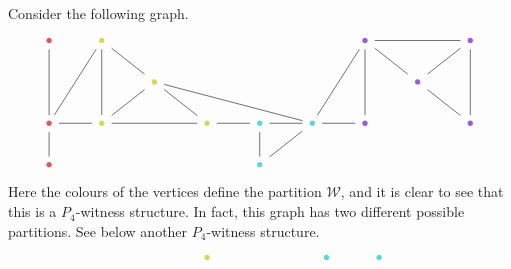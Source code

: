 \begin{example}
  Consider the following graph.
  \[\begin{tikzcd}
      \textcolor{rgb,255:red,214;green,92;blue,92}{\bullet} & \textcolor{rgb,255:red,214;green,214;blue,92}{\bullet} &&&&& \textcolor{rgb,255:red,153;green,92;blue,214}{\bullet} && \textcolor{rgb,255:red,153;green,92;blue,214}{\bullet} \\
      && \textcolor{rgb,255:red,214;green,214;blue,92}{\bullet} &&&&& \textcolor{rgb,255:red,153;green,92;blue,214}{\bullet} \\
      \textcolor{rgb,255:red,214;green,92;blue,92}{\bullet} & \textcolor{rgb,255:red,214;green,214;blue,92}{\bullet} && \textcolor{rgb,255:red,214;green,214;blue,92}{\bullet} & \textcolor{rgb,255:red,92;green,214;blue,214}{\bullet} & \textcolor{rgb,255:red,92;green,214;blue,214}{\bullet} & \textcolor{rgb,255:red,153;green,92;blue,214}{\bullet} && \textcolor{rgb,255:red,153;green,92;blue,214}{\bullet} \\
      \textcolor{rgb,255:red,214;green,92;blue,92}{\bullet} &&&& \textcolor{rgb,255:red,92;green,214;blue,214}{\bullet}
      \arrow[no head, from=1-1, to=3-1]
      \arrow[no head, from=3-1, to=4-1]
      \arrow[no head, from=1-2, to=3-2]
      \arrow[no head, from=3-2, to=2-3]
      \arrow[no head, from=2-3, to=3-4]
      \arrow[no head, from=3-4, to=3-2]
      \arrow[no head, from=3-2, to=3-1]
      \arrow[no head, from=3-1, to=1-2]
      \arrow[no head, from=3-4, to=3-5]
      \arrow[no head, from=3-5, to=4-5]
      \arrow[no head, from=4-5, to=3-6]
      \arrow[no head, from=3-6, to=1-7]
      \arrow[no head, from=1-7, to=1-9]
      \arrow[no head, from=1-9, to=2-8]
      \arrow[no head, from=2-8, to=3-9]
      \arrow[no head, from=3-9, to=1-9]
      \arrow[no head, from=2-8, to=1-7]
      \arrow[no head, from=3-7, to=1-7]
      \arrow[no head, from=3-5, to=3-6]
      \arrow[no head, from=3-6, to=2-3]
      \arrow[no head, from=2-3, to=1-2]
      \arrow[no head, from=3-6, to=3-7]
    \end{tikzcd}\]
  Here the colours of the vertices define the partition $\mathcal W$, and it is clear to see that this is a $P_4$-witness structure. In fact, this graph has two different possible partitions. See below another $P_4$-witness structure.
  \[\begin{tikzcd}
      && \textcolor{rgb,255:red,214;green,214;blue,92}{\bullet} &&& \textcolor{rgb,255:red,92;green,214;blue,214}{\bullet} & \textcolor{rgb,255:red,92;green,214;blue,214}{\bullet} \\

\end{tikzcd}\]
\end{example}
